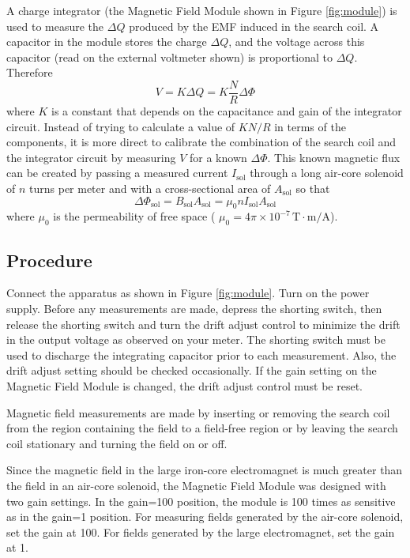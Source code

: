 A charge integrator (the Magnetic Field Module shown in Figure {\ref{fig:module}}) is used to measure the $\Delta Q$ produced by the EMF induced in the search coil. A capacitor in the module stores the charge $\Delta Q$, and the voltage across this capacitor (read on the external voltmeter shown) is proportional to $\Delta Q$. Therefore
\begin{equation}
  V=K\Delta Q=K\frac{N}{R}\Delta \Phi
\end{equation}
where $K$ is a constant that depends on the capacitance and gain of the integrator circuit. Instead of trying to calculate a value of $KN / R$ in terms of the components, it is more direct to calibrate the combination of the search coil and the integrator circuit by measuring $V$ for a known $\Delta \Phi$. This known magnetic flux can be created by passing a measured current $I_{\mathrm{sol}}$ through a long air-core solenoid of $n$ turns per meter and with a cross-sectional area of $A_{\mathrm{sol}}$ so that
\begin{equation}
  \Delta \Phi_{\mathrm{sol}}=B_{\mathrm{sol}}A_{\mathrm{sol}}=\mu_{0}nI_{\mathrm{sol}}A_{\mathrm{sol}}  
\end{equation}
where $\mu_{0}$ is the permeability of free space ( $\mu_{0} = 4\pi \times 10^{-7}\, \mathrm{T}\cdot  \mathrm{m} / \mathrm{A} $).

\subsection{Procedure}
Connect the apparatus as shown in Figure {\ref{fig:module}}. Turn on the power supply. Before any measurements are made, depress the shorting switch, then release the shorting switch and turn the drift adjust control to minimize the drift in the output voltage as observed on your meter. The shorting switch must be used to discharge the integrating capacitor prior to each measurement. Also, the drift adjust setting should be checked occasionally. If the gain setting on the Magnetic Field Module is changed, the drift adjust control must be reset.\myskip

Magnetic field measurements are made by inserting or removing the search coil from the region containing the field to a field-free region or by leaving the search coil stationary and turning the field on or off.\myskip

Since the magnetic field in the large iron-core electromagnet is much greater than the field in an air-core solenoid, the Magnetic Field Module was designed with two gain settings. In the gain=100 position, the module is 100 times as sensitive as in the gain=1 position. For measuring fields generated by the air-core solenoid, set the gain at 100. For fields generated by the large electromagnet, set the gain at 1.\myskip 

